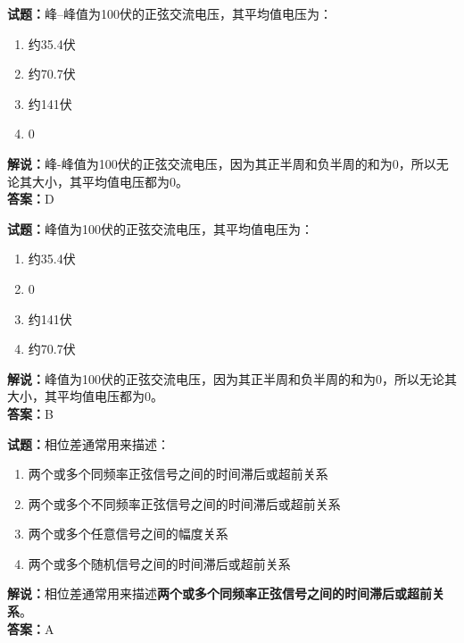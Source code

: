\documentclass{ctexbook}
\begin{document}
\vspace{\baselineskip}

\noindent\textbf{试题：}峰--峰值为\num{100}伏的正弦交流电压，其平均值电压为：
\begin{enumerate}[leftmargin=3em]
  \item 约\num{35.4}伏
  \item 约\num{70.7}伏
  \item 约\num{141}伏
  \item \num{0}
\end{enumerate}

\noindent\textbf{解说：}峰-峰值为\num{100}伏的正弦交流电压，因为其正半周和负半周的和为\num{0}，所以无论其大小，其平均值电压都为\num{0}。\\
\noindent\textbf{答案：}D

\vspace{\baselineskip}

\noindent\textbf{试题：}峰值为\num{100}伏的正弦交流电压，其平均值电压为：

\begin{enumerate}[leftmargin=3em]
  \item 约\num{35.4}伏
  \item \num{0}
  \item 约\num{141}伏
  \item 约\num{70.7}伏
\end{enumerate}

\noindent\textbf{解说：}峰值为\num{100}伏的正弦交流电压，因为其正半周和负半周的和为\num{0}，所以无论其大小，其平均值电压都为\num{0}。\\
\noindent\textbf{答案：}B

\vspace{\baselineskip}

\noindent\textbf{试题：}相位差通常用来描述：

\begin{enumerate}[leftmargin=3em]
  \item 两个或多个同频率正弦信号之间的时间滞后或超前关系
  \item 两个或多个不同频率正弦信号之间的时间滞后或超前关系
  \item 两个或多个任意信号之间的幅度关系
  \item 两个或多个随机信号之间的时间滞后或超前关系
\end{enumerate}

\noindent\textbf{解说：}相位差通常用来描述\textbf{两个或多个同频率正弦信号之间的时间滞后或超前关系}。\\\noindent\textbf{答案：}A
\end{document}
